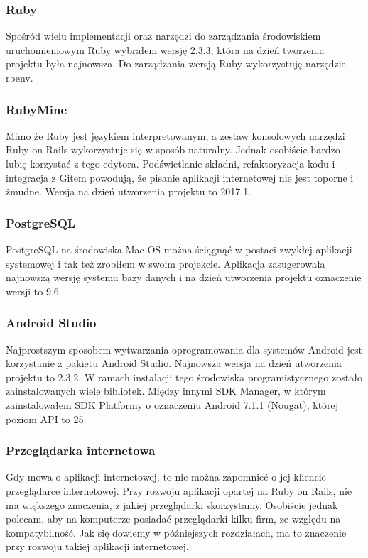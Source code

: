 \subsubsection{Ruby}
Spośród wielu implementacji oraz narzędzi do zarządzania środowiskiem uruchomieniowym Ruby wybrałem wersję 2.3.3, która na dzień tworzenia projektu była najnowsza. Do zarządzania wersją Ruby wykorzystuję narzędzie rbenv.

\subsubsection{RubyMine}
Mimo że Ruby jest językiem interpretowanym, a zestaw konsolowych narzędzi Ruby on Rails wykorzystuje się w sposób naturalny. Jednak osobiście bardzo lubię korzystać z tego edytora. Podświetlanie składni, refaktoryzacja kodu i integracja z Gitem powodują, że pisanie aplikacji internetowej nie jest toporne i żmudne. Wersja na dzień utworzenia projektu to 2017.1.

\subsubsection{PostgreSQL}
PostgreSQL na środowiska Mac OS można ściągnąć w postaci zwykłej aplikacji systemowej i tak też zrobiłem w swoim projekcie. Aplikacja zasugerowała najnowszą wersję systemu bazy danych i na dzień utworzenia projektu oznaczenie wersji to 9.6.

\subsubsection{Android Studio}
Najprostszym sposobem wytwarzania oprogramowania dla systemów Android jest korzystanie z pakietu Android Studio. Najnowsza wersja na dzień utworzenia projektu to 2.3.2. W ramach instalacji tego środowiska programistycznego zostało zainstalowanych wiele bibliotek. Między innymi SDK Manager, w którym zainstalowałem SDK Platformy o oznaczeniu Android 7.1.1 (Nougat), której poziom API to 25.

\subsubsection{Przeglądarka internetowa}
Gdy mowa o aplikacji internetowej, to nie można zapomnieć o jej kliencie — przeglądarce internetowej. Przy rozwoju aplikacji opartej na Ruby on Rails, nie ma większego znaczenia, z jakiej przeglądarki skorzystamy. Osobiście jednak polecam, aby na komputerze posiadać przeglądarki kilku firm, ze względu na kompatybilność. Jak się dowiemy w późniejszych rozdziałach, ma to znaczenie przy rozwoju takiej aplikacji internetowej.

